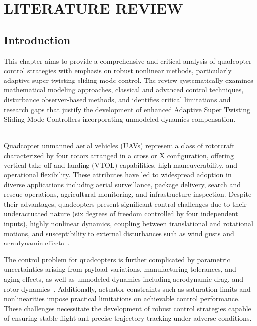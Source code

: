 \chapter{ LITERATURE REVIEW}
\section{Introduction}	
This chapter aims to provide a comprehensive and critical analysis of quadcopter control strategies with emphasis on robust nonlinear methods, particularly adaptive super twisting sliding mode control. The review systematically examines mathematical modeling approaches, classical and advanced control techniques, disturbance observer-based methods, and identifies critical limitations and research gaps that justify the development of enhanced Adaptive Super Twisting Sliding Mode Controllers  incorporating unmodeled dynamics compensation.


\\
Quadcopter unmanned aerial vehicles (UAVs) represent a class of rotorcraft characterized by four rotors arranged in a cross or X configuration, offering vertical take off and landing (VTOL) capabilities, high maneuverability, and operational flexibility. These attributes have led to widespread adoption in diverse applications including aerial surveillance, package delivery, search and rescue operations, agricultural monitoring, and infrastructure inspection. Despite their advantages, quadcopters present significant control challenges due to their underactuated nature (six degrees of freedom controlled by four independent inputs), highly nonlinear dynamics, coupling between translational and rotational motions, and susceptibility to external disturbances such as wind gusts and aerodynamic effects~\cite{fatemi2025adaptive,gedefaw2024improved}.

\noindent The control problem for quadcopters is further complicated by parametric uncertainties arising from payload variations, manufacturing tolerances, and aging effects, as well as unmodeled dynamics including aerodynamic drag, and rotor dynamics~\cite{abro2025swarm,wang2023robust}. Additionally, actuator constraints such as saturation limits and nonlinearities impose practical limitations on achievable control performance. These challenges necessitate the development of robust control strategies capable of ensuring stable flight and precise trajectory tracking under adverse conditions.

